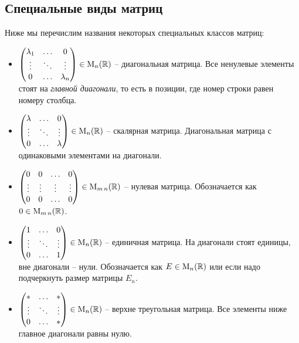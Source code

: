 \subsection{Специальные виды матриц}
\label{section::SpecialMatrices}

Ниже мы перечислим названия некоторых специальных классов матриц:
\begin{itemize}
\item 
$
\begin{pmatrix}
{\lambda_1}&{\ldots}&{0}\\
{\vdots}&{\ddots}&{\vdots}\\
{0}&{\ldots}&{\lambda_n}\\
\end{pmatrix}\in \operatorname{M}_{n}(\mathbb R)$ -- диагональная матрица.
Все ненулевые элементы стоят на {\it главной диагонали}, то есть в позиции, где номер строки равен номеру столбца.

\item
$
\begin{pmatrix}
{\lambda}&{\ldots}&{0}\\
{\vdots}&{\ddots}&{\vdots}\\
{0}&{\ldots}&{\lambda}\\
\end{pmatrix}\in \operatorname{M}_{n}(\mathbb R)$ -- скалярная матрица.
Диагональная матрица с одинаковыми элементами на диагонали.

\item 
$
\begin{pmatrix}
{0}&{0}&{\ldots}&{0}\\
{\vdots}&{\vdots}&{\vdots}&{\vdots}\\
{0}&{0}&{\ldots}&{0}\\
\end{pmatrix}\in \operatorname{M}_{m\,n}(\mathbb R)$ -- нулевая матрица.
Обозначается как $0\in \operatorname{M}_{m\,n}(\mathbb R)$.

\item
 $
\begin{pmatrix}
{1}&{\ldots}&{0}\\
{\vdots}&{\ddots}&{\vdots}\\
{0}&{\ldots}&{1}\\
\end{pmatrix}\in \operatorname{M}_{n}(\mathbb R)$ -- единичная матрица.
На диагонали стоят единицы, вне диагонали -- нули.
Обозначается как $E\in \operatorname{M}_{n}(\mathbb R)$ или если надо подчеркнуть размер матрицы $E_n$.

\item
 $
\begin{pmatrix}
{*}&{\ldots}&{*}\\
{\vdots}&{\ddots}&{\vdots}\\
{0}&{\ldots}&{*}\\
\end{pmatrix}\in \operatorname{M}_{n}(\mathbb R)$ -- верхне треугольная матрица.
Все элементы ниже главное диагонали равны нулю.


\end{itemize}
